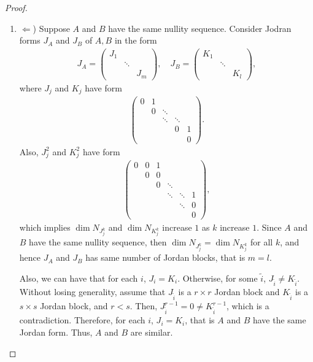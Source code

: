 \documentclass[11pt]{article}
\theoremstyle{definition}
\numberwithin{equation}{subsection}
\begin{document}
\begin{proof}
\begin{enumerate}[label=(\alph*)]
    \item $\Leftarrow$) Suppose $A$ and $B$ have the same nullity sequence. Consider Jodran forms $J_A$ and $J_B$ of $A, B$ in the form
    \begin{align*}
        J_A = \begin{pmatrix}
            J_1 & & \\
            & \ddots & \\
            & & J_m
        \end{pmatrix}, \quad J_B = \begin{pmatrix}
            K_1 & & \\
            & \ddots & \\
            & & K_l
        \end{pmatrix},
    \end{align*}
    where $J_j$ and $K_j$ have form 
    \begin{align*}
        \begin{pmatrix}
            0 & 1 & & & \\
            & 0 & \ddots & & \\
            & & \ddots & \ddots & \\
            & & & 0 & 1 \\
            & & & & 0
        \end{pmatrix}.
    \end{align*}
    Also, $J_j^2$ and $K_j^2$ have form
    \begin{align*}
        \begin{pmatrix}
            0 & 0 & 1 & & & \\
            & 0 & 0 & & & \\
            & & 0 & \ddots & & \\
            & & & \ddots & \ddots & 1 \\
            & & & & \ddots & 0 \\
            & & & & & 0
        \end{pmatrix},
    \end{align*}
    which implies $\dim N_{J_j^k}$ and $\dim N_{K_j^k}$ increase $1$ as $k$ increase $1$. Since $A$ and $B$ have the same nullity sequence, then $\dim N_{J_j^k} = \dim N_{K_j^k}$ for all $k$, and hence $J_A$ and $J_B$ has same number of Jordan blocks, that is $m = l$. 
    
    Also, we can have that for each $i$, $J_i = K_i$. Otherwise, for some $\tilde{i}$, $J_{\tilde{i}} \neq K_{\tilde{i}}$. Without losing generality, assume that $J_{\tilde{i}}$ is a $r \times r$ Jordan block and $K_{\tilde{i}}$ is a $s \times s$ Jordan block, and $r < s$. Then, $J_{\tilde{i}}^{r-1} = 0 \neq K_{\tilde{i}}^{r-1}$, which is a contradiction. Therefore, for each $i$, $J_i = K_i$, that is $A$ and $B$ have the same Jordan form. Thus, $A$ and $B$ are similar.
\end{enumerate}
\end{proof}
\end{document}
